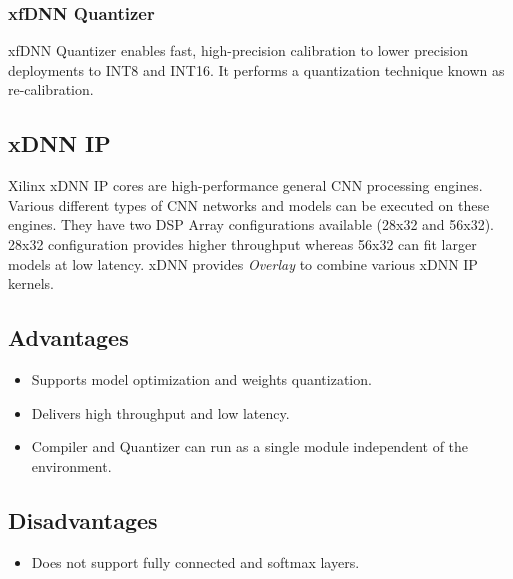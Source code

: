 \documentclass[titlepage]{report}
\begin{document}
\subsubsection{xfDNN Quantizer} 

xfDNN Quantizer enables fast, high-precision calibration to lower precision deployments to INT8 and INT16. It performs a quantization technique known as re-calibration.

\subsection{xDNN IP}
Xilinx xDNN IP cores are high-performance general CNN processing engines. Various different types of CNN networks and models can be executed on these engines. They have two DSP Array configurations available (28x32 and 56x32). 28x32 configuration provides higher throughput whereas 56x32 can fit larger models at low latency.
xDNN provides \textit{Overlay} to combine various xDNN IP kernels.

\subsection{Advantages}
  
 \begin{itemize}
 \item Supports model optimization and weights quantization.
 \item Delivers high throughput and low latency.
 \item Compiler and Quantizer can run as a single module independent of the environment.

 \end{itemize}
 
\subsection{Disadvantages}
 \begin{itemize}
 \item Does not support fully connected and softmax layers.
 
 \end{itemize}
 
\end{document}
